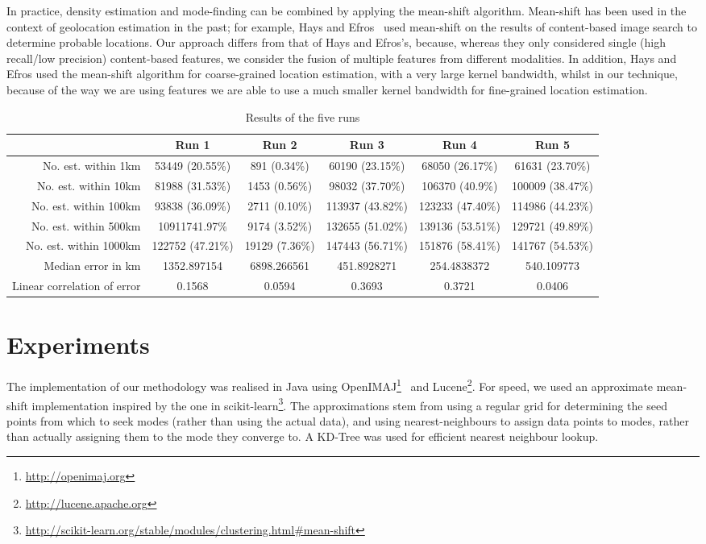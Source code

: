 \documentclass{../acm_proc_article-me11_tweaked}
\begin{document}
In practice, density estimation and mode-finding can be combined by applying the mean-shift algorithm. Mean-shift has been used in the context of geolocation estimation in the past; for example, Hays and Efros~\cite{Hays:2008:im2gps} used mean-shift on the results of content-based image search to determine probable locations. Our approach differs from that of Hays and Efros's, because, whereas they only considered single (high recall/low precision) content-based features, we consider the fusion of multiple features from different modalities. In addition, Hays and Efros used the mean-shift algorithm for coarse-grained location estimation, with a very large kernel bandwidth, whilst in our technique, because of the way we are using features we are able to use a much smaller kernel bandwidth for fine-grained location estimation.

\begin{table*}[ht!]
	\centering
	\caption{\label{tab:results}Results of the five runs}
	\begin{tabular}{|r||c|c|c|c|c|}
		\hline
		 & Run 1 & Run 2 & Run 3 & Run 4 & Run 5 \\ \hline \hline
		No. est. within 1km & 53449 (20.55\%) & 891 (0.34\%) & 60190 (23.15\%) & 68050 (26.17\%) & 61631 (23.70\%) \\ \hline
		No. est. within 10km & 81988 (31.53\%) & 1453 (0.56\%) & 98032 (37.70\%) & 106370 (40.9\%) & 100009 (38.47\%) \\ \hline
		No. est. within 100km & 93838 (36.09\%) & 2711 (0.10\%) & 113937 (43.82\%) & 123233 (47.40\%) & 114986 (44.23\%) \\ \hline
		No. est. within 500km & 10911741.97\% & 9174 (3.52\%) & 132655 (51.02\%) & 139136 (53.51\%) & 129721 (49.89\%) \\ \hline
		No. est. within 1000km & 122752 (47.21\%) & 19129 (7.36\%) & 147443 (56.71\%) & 151876 (58.41\%) & 141767 (54.53\%) \\ \hline
		Median error in km & 1352.897154 & 6898.266561 & 451.8928271 & 254.4838372 & 540.109773 \\ \hline
		Linear correlation of error & 0.1568 & 0.0594 & 0.3693 & 0.3721 & 0.0406 \\ \hline
	\end{tabular}
\end{table*}

\section{Experiments}
The implementation of our methodology was realised in Java using OpenIMAJ\footnote{\url{http://openimaj.org}}~\cite{Hare:2011:OIJ:2072298.2072421} and Lucene\footnote{\url{http://lucene.apache.org}}. For speed, we used an approximate mean-shift implementation inspired by the one in scikit-learn\footnote{\url{http://scikit-learn.org/stable/modules/clustering.html#mean-shift}}. The approximations stem from using a regular grid for determining the seed points from which to seek modes (rather than using the actual data), and using nearest-neighbours to assign data points to modes, rather than actually assigning them to the mode they converge to. A KD-Tree was used for efficient nearest neighbour lookup.
\end{document}
